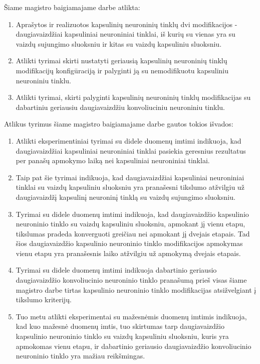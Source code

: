 
Šiame magistro baigiamajame darbe atlikta:

\begin{enumerate}
	\item Aprašytos ir realizuotos kapsulinių neuroninių tinklų dvi modifikacijos - daugiavaizdžiai kapsuliniai neuroniniai tinklai, iš kurių su vienas yra su vaizdų sujungimo sluoksniu ir kitas su vaizdų kapsuliniu sluoksniu.
	\item Atlikti tyrimai skirti nustatyti geriausią kapsulinių neuroninių tinklų modifikacijų konfigūraciją ir palyginti ją su nemodifikuotu kapsuliniu neuroniniu tinklu.
	\item Atlikti tyrimai, skirti palyginti kapsulinių neuroninių tinklų modifikacijas su dabartiniu geriausiu daugiavaizdžiu konvoliuciniu neuroniniu tinklu.
\end{enumerate}

Atlikus tyrimus šiame magistro baigiamajame darbe gautos tokios išvados:

\begin{enumerate}
	\item Atlikti eksperimentiniai tyrimai su didele duomenų imtimi indikuoja, kad daugiavaizdžiai kapsuliniai neuroniniai tinklai pasiekia geresnius rezultatus per panašų apmokymo laiką nei kapsuliniai neuroniniai tinklai.
	\item Taip pat šie tyrimai indikuoja, kad daugiavaizdžiai kapsuliniai neuroniniai tinklai su vaizdų kapsuliniu sluoksniu yra pranašesni tikslumo atžvilgiu už daugiavaizdžį kapsulinį neuroninį tinklą su vaizdų sujungimo sluoksniu.
	\item Tyrimai su didele duomenų imtimi indikuoja, kad daugiavaizdžio kapsulinio neuroninio tinklo su vaizdų kapsuliniu sluoksniu, apmokant jį vienu etapu, tikslumas pradeda konverguoti greičiau nei apmokant jį dvejais etapais. Tad šios daugiavaizdžio kapsulinio neuroninio tinklo modifikacijos apmokymas vienu etapu yra pranašesnis laiko atžvilgiu už apmokymą dvejais etapais.
	\item Tyrimai su didele duomenų imtimi indikuoja dabartinio geriausio daugiavaizdžio konvoliucinio neuroninio tinklo pranašumą prieš visas šiame magistro darbe tirtas kapsulinio neuroninio tinklo modifikacijas atsižvelgiant į tikslumo kriterijų.
	\item Tuo metu atlikti eksperimentai su mažesnėmis duomenų imtimis indikuoja, kad kuo mažesnė duomenų imtis, tuo skirtumas tarp daugiavaizdžio kapsulinio neuroninio tinklo su vaizdų kapsuliniu sluoksniu, kuris yra apmokomas vienu etapu, ir dabartinio geriausio daugiavaizdžio konvoliucinio neuroninio tinklo yra mažiau reikšmingas.
\end{enumerate}

